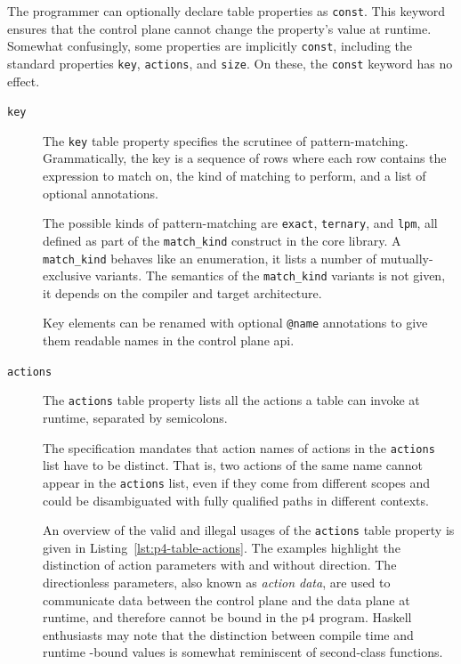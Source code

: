 The programmer can optionally declare table properties as \texttt{const}. This
keyword ensures that the control plane cannot change the property's value at
runtime. Somewhat confusingly, some properties are implicitly \texttt{const},
including the standard properties \texttt{key}, \texttt{actions}, and
\texttt{size}. On these, the \texttt{const} keyword has no effect.


\begin{description}

\item[\texttt{key}] The \texttt{key} table property specifies the scrutinee of
pattern-matching. Grammatically, the key is a sequence of rows where each row
contains the expression to match on, the kind of matching to perform, and a list
of optional annotations.

The possible kinds of pattern-matching are \texttt{exact}, \texttt{ternary}, and
\texttt{lpm}, all defined as part of the \texttt{match\_kind} construct in the
core library. A
\texttt{match\_kind} behaves like an enumeration, it lists a number of
mutually-exclusive variants. The semantics of the \texttt{match\_kind} variants
is not given, it depends on the compiler and target architecture.

Key elements can be renamed with optional \texttt{@name} annotations to give
them readable names in the control plane \acrshort{api}.

\item[\texttt{actions}] The \texttt{actions} table property lists all the
actions a table can invoke at runtime, separated by semicolons.

The specification mandates that action names of actions in the \texttt{actions}
list have to be distinct. That is, two actions of the same name cannot appear in
the \texttt{actions} list, even if they come from different scopes and could be
disambiguated with fully qualified paths in different contexts.

An overview of the valid and illegal usages of the \texttt{actions} table
property is given in Listing~\ref{lst:p4-table-actions}. The examples highlight
the distinction of action parameters with and without direction. The
directionless parameters, also known as \emph{action data}, are used to
communicate data between the control plane and the data plane at runtime, and
therefore cannot be bound in the \acrshort{p4} program. Haskell enthusiasts may
note that the distinction between compile time and runtime -bound values is
somewhat reminiscent of second-class functions.


\end{description}

